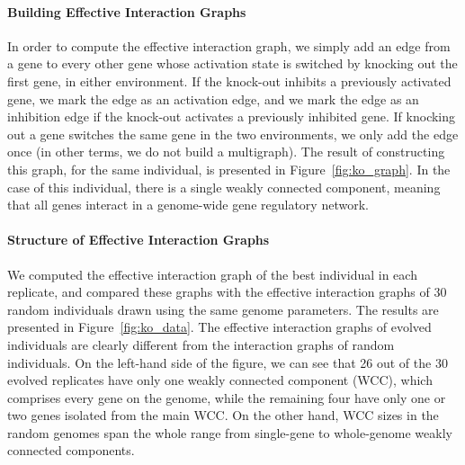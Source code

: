 \paragraph{Building Effective Interaction Graphs}
In order to compute the effective interaction graph, we simply add an edge from a gene to every other gene whose activation state is switched by knocking out the first gene, in either environment.
If the knock-out inhibits a previously activated gene, we mark the edge as an activation edge, and we mark the edge as an inhibition edge if the knock-out activates a previously inhibited gene.
If knocking out a gene switches the same gene in the two environments, we only add the edge once (in other terms, we do not build a multigraph).
The result of constructing this graph, for the same individual, is presented in Figure~\ref{fig:ko_graph}.
In the case of this individual, there is a single weakly connected component, meaning that all genes interact in a genome-wide gene regulatory network.

\paragraph{Structure of Effective Interaction Graphs}
We computed the effective interaction graph of the best individual in each replicate, and compared these graphs with the effective interaction graphs of 30 random individuals drawn using the same genome parameters.
The results are presented in Figure~\ref{fig:ko_data}.
The effective interaction graphs of evolved individuals are clearly different from the interaction graphs of random individuals.
On the left-hand side of the figure, we can see that 26 out of the 30 evolved replicates have only one weakly connected component (WCC), which comprises every gene on the genome, while the remaining four have only one or two genes isolated from the main WCC.
On the other hand, WCC sizes in the random genomes span the whole range from single-gene to whole-genome weakly connected components.

